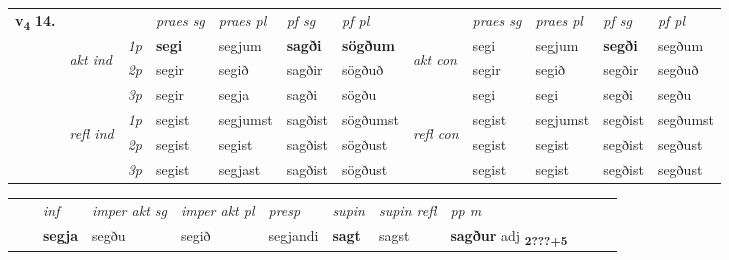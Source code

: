 \begin{tabular}{llllllllllll} \toprule
\multirow{4}{*}{{{\textbf{v{\textsubscript{4}}} \Large{\textbf{14.}}}}}  & &   &  \textit{praes sg}  & \textit{praes pl}  &\textit{ pf sg} & \textit{pf pl} &  &  \textit{praes sg}  & \textit{praes pl}  & \textit{pf sg} & \textit{pf pl } \\*
	\cmidrule{4-7} \cmidrule{9-12}
 & \multirow{3}{*}{\begin{turn}{90}\textit{akt ind}\end{turn}} & {\textit{1p}} & \textbf{segi} & segjum    & \textbf{sagði} & \textbf{sögðum} & \multirow{3}{*}{\begin{turn}{90}\textit{akt con}\end{turn}} &segi & segjum & \textbf{segði} & segðum\\*
& &  {\textit{2p}} &  segir  & segið   & sagðir & sögðuð & & segir & segið & segðir & segðuð \\*
& &  {\textit{3p}} & segir & segja   & sagði & sögðu & & segi & segi& segði & segðu  \\*
\cmidrule{4-7} \cmidrule{9-12}
 &\multirow{3}{*}{\begin{turn}{90}\textit{refl ind}\end{turn}} & {\textit{1p}} & segist & segjumst    & sagðist & sögðumst & \multirow{3}{*}{\begin{turn}{90}\textit{refl con}\end{turn}}  &segist & segjumst & segðist & segðumst\\*
 &&  {\textit{2p}} &  segist  & segist   & sagðist & sögðust & &segist & segist & segðist & segðust \\*
& &  {\textit{3p}} & segist & segjast   & sagðist & sögðust & & segist & segist& segðist & segðust  \\*
\cmidrule{4-7} \cmidrule{9-12}
\end{tabular}


\begin{tabular}{llllllllllll}
 & & \textit{inf} & \textit{imper akt sg} & \textit{imper akt pl}   & \textit{presp} & \textit{supin} & \textit{supin refl} & \textit{pp m}     \\*
  & & \textbf{segja} & segðu  & segið   & segjandi &  \textbf{sagt} & sagst & \textbf{sagður} adj \textbf{\textsubscript{2???+5}} \\*
\cmidrule{1-12}
\end{tabular}



